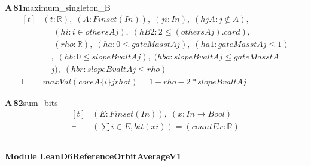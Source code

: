 \documentclass[conference]{IEEEtran}
\theoremstyle{definition}
\newcommand{\lean}[1]{\textsf{\footnotesize #1}}
\begin{document}
\noindent\textbf{A\,81}\quad\lean{maximum\_singleton\_B}
{\footnotesize\[ \begin{aligned}[t]
&(\mathit{t} : \mathbb{R} ),\; (\mathit{A} : \mathit{Finset} (\mathit{I} \mathit{n})),\; (\mathit{j} \mathit{i} : \mathit{I} \mathit{n}),\; (\mathit{hjA} : \mathit{j} \notin \mathit{A}),\\
&\quad \; (\mathit{hi} : \mathit{i} \in \mathit{others} \mathit{A} \mathit{j}),\; (\mathit{hB2} : 2 \leq (\mathit{others} \mathit{A} \mathit{j}).\mathit{card}),\\
&\quad \; (\mathit{rho} : \mathbb{R} ),\; (\mathit{ha} : 0 \leq \mathit{gateMass} \mathit{t} \mathit{A} \mathit{j}),\; (\mathit{ha1} : \mathit{gateMass} \mathit{t} \mathit{A} \mathit{j} \leq 1)\\
&\quad ,\; (\mathit{hb} : 0 \leq \mathit{slopeBval} \mathit{t} \mathit{A} \mathit{j}),\; (\mathit{hba} : \mathit{slopeBval} \mathit{t} \mathit{A} \mathit{j} \leq \mathit{gateMass} \mathit{t} \mathit{A}\\
&\quad \mathit{j}),\; (\mathit{hbr} : \mathit{slopeBval} \mathit{t} \mathit{A} \mathit{j} \leq \mathit{rho})\\
\vdash\;&\mathit{maxVal} (\mathit{core} \mathit{A} \{ \mathit{i}\} \mathit{j} \mathit{rho} \mathit{t}) = 1+\mathit{rho}-2*\mathit{slopeBval} \mathit{t} \mathit{A} \mathit{j}
\end{aligned} \]}

\noindent\textbf{A\,82}\quad\lean{sum\_bits}
{\footnotesize\[ \begin{aligned}[t]
&(\mathit{E} : \mathit{Finset} (\mathit{I} \mathit{n})),\; (\mathit{x} : \mathit{I} \mathit{n} \to \mathit{Bool})\\
\vdash\;&(\textstyle\sum \mathit{i} \in \mathit{E}, \mathit{bit} (\mathit{x} \mathit{i})) = (\mathit{count} \mathit{E} \mathit{x} : \mathbb{R} )
\end{aligned} \]}

\vspace{4pt}\noindent\rule{\columnwidth}{0.4pt}\par\vspace{2pt}
\noindent\textbf{Module \lean{LeanD6ReferenceOrbitAverageV1}}\par\vspace{3pt}
\end{document}
